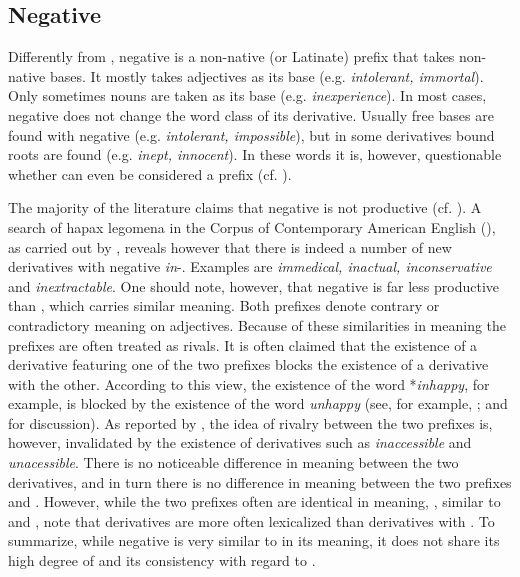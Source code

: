 \subsection{Negative  } \label{negative in}

Differently from , negative  is a non-native (or Latinate) prefix that takes non-native bases. It mostly takes adjectives as its base (e.g. \textit{intolerant, immortal}). Only sometimes nouns are taken as its base (e.g. \textit{inexperience}).  In most cases, negative  does not change the word class of its derivative.  Usually free bases are found with negative  (e.g. \textit{intolerant, impossible}), but in some derivatives bound roots are found (e.g. \textit{inept, innocent}). In these words it is, however, questionable whether  can even be considered a prefix (cf. \citealt[356f., 611]{Bauer.2013}).

The majority of the literature claims that negative  is not productive (cf. \citealt[1688]{Bauer.2002}). A search of hapax legomena in the Corpus of Contemporary American English (\citealt{Davies.20082014}), as carried out by \citet[361]{Bauer.2013}, reveals however that there is indeed a number of new derivatives with negative \textit{in}-. Examples are \textit{immedical, inactual, inconservative} and \textit{inextractable}.  One should note, however, that negative  is far less productive than , which carries similar meaning. Both prefixes denote contrary or contradictory meaning on adjectives.
 Because of these similarities in meaning the prefixes are often treated as rivals. It is often claimed that the existence of a derivative featuring one of the two prefixes blocks the existence of  a derivative with the other. According to this view, the existence of the word *\textit{inhappy}, for example, is blocked by the existence of the word \textit{unhappy} (see, for example,  \citealt[467ff.]{Jespersen.1965}; \citealt[1688f.]{Bauer.2002} and \citealt[377ff.]{Bauer.2013} for discussion).  
As reported by \citet[377]{Bauer.2013}, the idea of rivalry between the two prefixes is, however, invalidated by the existence of derivatives such as \textit{inaccessible} and \textit{unacessible}. There is no noticeable difference in meaning between the two derivatives, and in turn there is no difference in meaning between the two prefixes  and .
However, while the two prefixes often are identical in meaning, \citet[379]{Bauer.2013}, similar to  \cite{Jespersen.1965} and \cite{Bauer.2002},  note that derivatives are more often lexicalized than derivatives with . To summarize, while negative  is very similar to  in its meaning, it does not share its high degree of  and its consistency with regard to .

